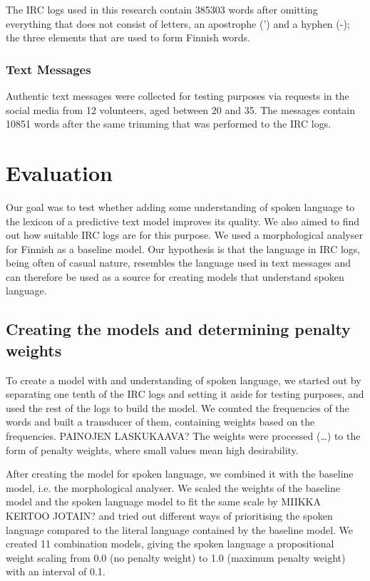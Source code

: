 \documentclass[a4paper,conference]{IEEEtran}
\begin{document}
The IRC logs used in this research contain 385303 words after omitting everything that does not consist of letters, an apostrophe (') and a hyphen (-); the three elements that are used to form Finnish words.

\subsubsection{Text Messages}

Authentic text messages were collected for testing purposes via requests in the social media from 12 volunteers, aged between 20 and 35. The messages contain 10851 words after the same trimming that was performed to the IRC logs.

\section{Evaluation}
\label{sec:evaluation}

Our goal was to test whether adding some understanding of spoken language to the lexicon of a predictive text model improves its quality. We also aimed to find out how suitable IRC logs are for this purpose. We used a morphological analyser for Finnish as a baseline model. Our hypothesis is that the language in IRC logs, being often of casual nature, resembles the language used in text messages and can therefore be used as a source for creating models that understand spoken language.


\subsection{Creating the models and determining penalty weights}
\label{sec:weighting}
To create a model with and understanding of spoken language, we started out by separating one tenth of the IRC logs and setting it aside for testing purposes, and used the rest of the logs to build the model. We counted the frequencies of the words and built a transducer of them, containing weights based on the frequencies. PAINOJEN LASKUKAAVA? The weights were processed (…) to the form of penalty weights, where small values mean high desirability.

After creating the model for spoken language, we combined it with the baseline model, i.e. the morphological analyser. We scaled the weights of the baseline model and the spoken language model to fit the same scale by MIIKKA KERTOO JOTAIN? and tried out different ways of prioritising the spoken language compared to the literal language contained by the baseline model. We created 11 combination models, giving the spoken language a propositional weight scaling from 0.0 (no penalty weight) to 1.0 (maximum penalty weight) with an interval of 0.1. 
\end{document}
